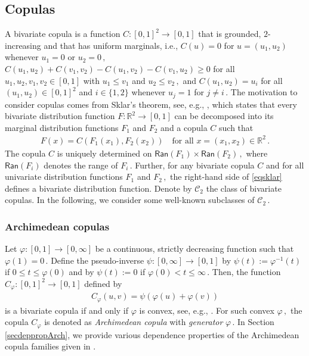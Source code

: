 \documentclass{article}
\newcommand{\R}{\mathbb{R}}
\newcommand{\cC}{\mathcal{C}}
\newcommand{\Ran}{\mathsf{Ran}}
\begin{document}
\subsection{Copulas}

A bivariate copula is a function \(C\colon [0,1]^2\to [0,1]\) that is grounded, \(2\)-increasing and that has uniform marginals, i.e., \(C(u)=0\) for \(u=(u_1,u_2)\) whenever \(u_1=0\) or \(u_2=0\,,\) \(C(u_1,u_2)+C(v_1,v_2)-C(u_1,v_2)-C(v_1,u_2)\geq 0\) for all $u_1,u_2,v_1,v_2\in [0,1]$ with \(u_1\leq v_1\) and \(u_2\leq v_2\,,\) and \(C(u_1,u_2)=u_i\) for all $(u_1,u_2)\in [0,1]^2$ and \(i\in \{1,2\}\) whenever \(u_j=1\) for \(j\neq i\,.\)
The motivation to consider copulas comes from Sklar's theorem, see, e.g., \cite[Theorem 2.3.3]{Nelsen-2006}, which states that every bivariate distribution function \(F\colon \R^2\to [0,1]\) can be decomposed into its marginal distribution functions \(F_1\) and \(F_2\) and a copula \(C\) such that
\begin{align}\label{eqsklar}
    F(x)=C(F_1(x_1),F_2(x_2))\quad \text{for all } x=(x_1,x_2)\in \R^2\,.
\end{align}
The copula \(C\) is uniquely determined on \(\Ran(F_1)\times \Ran(F_2)\,,\) where \(\Ran(F_i)\) denotes the range of \(F_i\,.\)
Further, for any bivariate copula \(C\) and for all univariate distribution functions \(F_1\) and \(F_2\,,\) the right-hand side of \eqref{eqsklar} defines a bivariate distribution function.
Denote by \(\cC_2\) the class of bivariate copulas.
In the following, we consider some well-known subclasses of \(\cC_2\,.\)

\subsubsection{Archimedean copulas}
\label{subsubsec:Arch}

Let \(\varphi\colon [0,1]\to [0,\infty]\) be a continuous, strictly decreasing function such that \(\varphi(1)=0\,.\)
Define the pseudo-inverse \(\psi\colon [0,\infty]\to [0,1]\) by \(\psi(t) := \varphi^{-1}(t)\) if \(0\leq t \leq \varphi(0)\) and by \(\psi(t) := 0\) if \(\varphi(0)< t \leq \infty\,.\)
Then, the function \(C_\varphi\colon [0,1]^2\to [0,1]\) defined by
    \begin{align*}
        C_\varphi(u,v) = \psi(\varphi(u)+\varphi(v))
    \end{align*}
is a bivariate copula if and only if \(\varphi\) is convex, see, e.g., \cite[Theorem 4.1.4]{Nelsen-2006}.
For such convex \(\varphi\,,\) the copula \(C_\varphi\) is denoted as \emph{Archimedean copula} with \emph{generator} \(\varphi\,.\)
In Section \ref{secdeppropArch}, we provide various dependence properties of the Archimedean copula families given in \cite[Chapter 4]{Nelsen-2006}.
\end{document}
